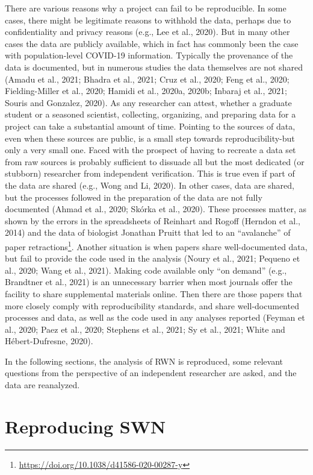 \documentclass[]{elsarticle} %
\begin{document}
There are various reasons why a project can fail to be reproducible. In
some cases, there might be legitimate reasons to withhold the data,
perhaps due to confidentiality and privacy reasons (e.g., Lee et al.,
2020). But in many other cases the data are publicly available, which in
fact has commonly been the case with population-level COVID-19
information. Typically the provenance of the data is documented, but in
numerous studies the data themselves are not shared (Amadu et al., 2021;
Bhadra et al., 2021; Cruz et al., 2020; Feng et al., 2020;
Fielding-Miller et al., 2020; Hamidi et al., 2020a, 2020b; Inbaraj et
al., 2021; Souris and Gonzalez, 2020). As any researcher can attest,
whether a graduate student or a seasoned scientist, collecting,
organizing, and preparing data for a project can take a substantial
amount of time. Pointing to the sources of data, even when these sources
are public, is a small step towards reproducibility-but only a very
small one. Faced with the prospect of having to recreate a data set from
raw sources is probably sufficient to dissuade all but the most
dedicated (or stubborn) researcher from independent verification. This
is true even if part of the data are shared (e.g., Wong and Li, 2020).
In other cases, data are shared, but the processes followed in the
preparation of the data are not fully documented (Ahmad et al., 2020;
Skórka et al., 2020). These processes matter, as shown by the errors in
the spreadsheets of Reinhart and Rogoff (Herndon et al., 2014) and the
data of biologist Jonathan Pruitt that led to an ``avalanche'' of paper
retractions\footnote{\url{https://doi.org/10.1038/d41586-020-00287-y}}.
Another situation is when papers share well-documented data, but fail to
provide the code used in the analysis (Noury et al., 2021; Pequeno et
al., 2020; Wang et al., 2021). Making code available only ``on demand''
(e.g., Brandtner et al., 2021) is an unnecessary barrier when most
journals offer the facility to share supplemental materials online. Then
there are those papers that more closely comply with reproducibility
standards, and share well-documented processes and data, as well as the
code used in any analyses reported (Feyman et al., 2020; Paez et al.,
2020; Stephens et al., 2021; Sy et al., 2021; White and Hébert-Dufresne,
2020).

In the following sections, the analysis of RWN is reproduced, some
relevant questions from the perspective of an independent researcher are
asked, and the data are reanalyzed.

\hypertarget{reproducing-swn}{%
\section{Reproducing SWN}\label{reproducing-swn}}
\end{document}
